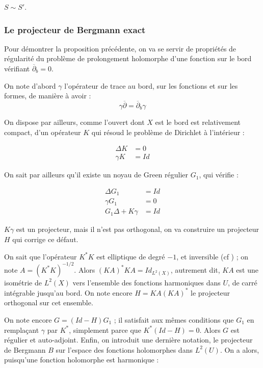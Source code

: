 \begin{prop}
  $S \sim S'$.
\end{prop}

\subsubsection{Le projecteur de Bergmann exact}
Pour démontrer la proposition précédente, on va se servir de propriétés de régularité du problème de prolongement holomorphe d'une fonction sur le bord vérifiant $\overline{\partial}_b =0$.

On note d'abord $\gamma$ l'opérateur de trace au bord, sur les fonctions et sur les formes, de manière à avoir :
\begin{equation*}
  \gamma \overline{\partial} = \overline{\partial}_b\gamma
\end{equation*}

\noindent On dispose par ailleurs, comme l'ouvert dont $X$ est le bord est relativement compact, d'un opérateur $K$ qui résoud le problème de Dirichlet à l'intérieur :

\begin{align*}
  \Delta K &= 0\\
  \gamma K &= Id
\end{align*}

\noindent On sait par ailleurs qu'il existe un noyau de Green régulier $G_1$, qui vérifie :

\begin{align*}
  \Delta G_1 &= Id\\
  \gamma G_1 &= 0\\
  G_1\Delta  + K\gamma &= Id
\end{align*}

\noindent $K\gamma$ est un projecteur, mais il n'est pas orthogonal, on va construire un projecteur $H$ qui corrige ce défaut.

On sait que l'opérateur $K^*K$ est elliptique de degré $-1$, et inversible (cf \cite{Trouverunesource}) ; on note $A=(K^*K)^{-1/2}$. Alors $(KA)^*KA = Id_{L^2(X)}$, autrement dit, $KA$ est une isométrie de $L^2(X)$ vers l'ensemble des fonctions harmoniques dans $U$, de carré intégrable jusqu'au bord. On note encore $H=KA(KA)^*$ le projecteur orthogonal sur cet ensemble.

On note encore $G=(Id-H)G_1$ ; il satisfait aux mêmes conditions que $G_1$ en remplaçant $\gamma$ par $K^*$, simplement parce que $K^*(Id-H) = 0$. Alors $G$ est régulier et auto-adjoint. Enfin, on introduit une dernière notation, le projecteur de Bergmann $B$ sur l'espace des fonctions holomorphes dans $L^2(U)$. On a alors, puisqu'une fonction holomorphe est harmonique :

